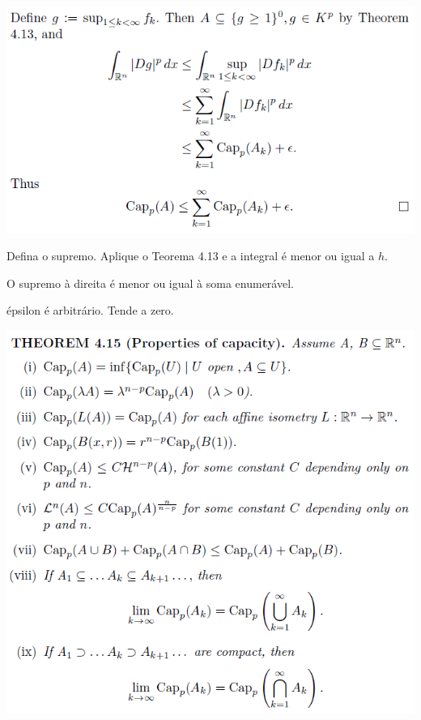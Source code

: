 \documentclass[12pt]{article}
\begin{document}
\vspace{300mm}

		\begin{center}
		\includegraphics{9}
		\end{center}

Defina o supremo. Aplique o Teorema 4.13 e a integral \'e menor ou igual a $h$.

O supremo \`a direita \'e menor ou igual \`a soma enumer\'avel.

\'epsilon \'e arbitr\'ario. Tende a zero.

\vspace{300mm}

		\begin{center}
		\includegraphics[scale=.9]{10}
		\end{center}
\end{document}
